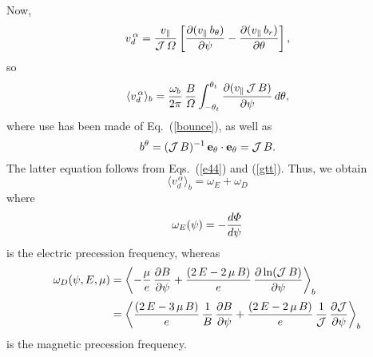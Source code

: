 \documentclass[12pt,prb,aps,notitlepage]{revtex4-1}
\begin{document}
 Now,
 \begin{equation}
 v_d^{\,\alpha}= \frac{v_\parallel}{{\cal J}\,{\mit\Omega}}\left[\frac{\partial (v_\parallel\,b_\theta)}{\partial\psi} - \frac{\partial (v_\parallel\,b_r)}{\partial \theta}\right],
 \end{equation}
 so
 \begin{equation}
 \langle v_d^{\,\alpha}\rangle_b = \frac{\omega_b}{2\pi}\,\frac{B}{{\mit\Omega}}\int_{-\theta_t}^{\theta_t}\frac{\partial (v_\parallel\,{\cal J}\,B)}{\partial\psi}\,d\theta,
 \end{equation}
 where use has been made of Eq.~(\ref{bounce}), as well as 
 \begin{equation}
 b^\theta = ({\cal J}\,B)^{-1}\,{\bf e}_\theta\cdot{\bf e}_\theta= {\cal J}\,B.
 \end{equation}
 The latter equation follows from Eqs.~(\ref{e44}) and (\ref{gtt}). Thus, we obtain 
 \begin{equation}\label{e98}
  \langle v_d^{\,\alpha}\rangle_b=\omega_E +\omega_D
 \end{equation}
 where 
 \begin{equation}
 \omega_E(\psi)= -\frac{d{\mit\Phi}}{d\psi}
 \end{equation}
 is the  electric precession frequency, whereas 
 \begin{align}
 \omega_D(\psi,E,\mu)&=\left\langle- \frac{\mu}{e}\,\frac{\partial B}{\partial\psi} +\frac{(2\,E-2\,\mu\,B)}{e}\,\frac{\partial \ln({\cal J}\,B)}{\partial\psi}
 \right\rangle_b\nonumber\\[0.5ex]
 &=\left\langle\frac{(2\,E-3\,\mu\,B)}{e}\,\frac{1}{B}\,\frac{\partial B}{\partial\psi} +\frac{(2\,E-2\,\mu\,B)}{e}\,\frac{1}{\cal J}\,\frac{\partial{\cal J}}{\partial\psi}
 \right\rangle_b
 \end{align}
 is the magnetic precession frequency. 
 
\end{document}
